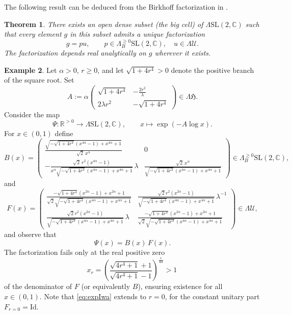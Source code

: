 \documentclass[12pt,a4paper]{amsart}
\newtheorem{theorem}{Theorem}[section]
\theoremstyle{definition}
\newtheorem{example}[theorem]{Example}
\theoremstyle{remark}
\newcommand{\R}{\mathbb R}
\newcommand{\C}{\mathbb C}
\begin{document}
The following  result can be deduced from the Birkhoff factorization in \cite{PressleySegal}. 
\begin{theorem}
There exists
an open dense subset (the \emph{big cell}) of $\Lambda\mathrm{SL}(2,\C)$ such that every
element $g$ in this subset admits a unique factorization
\[
g
=
pu,
\qquad
p\in \Lambda^{\geq0}_{B}\mathrm{SL}(2,\C),
\quad
u\in \Lambda\mathcal U.
\]
The factorization depends real analytically on $g$ wherever it exists.
\end{theorem}


\begin{example}\label{example:factor}\cite{Heller2025}
Let $\alpha>0$, $r\geq0$, and let $\sqrt{1+4r^4}>0$ denote the positive branch of the square root.
Set
\[
A
:=
\alpha
\begin{pmatrix}
 \sqrt{1+4 r^4}  & -\frac{2 r^2}{\lambda } \\
 2 \lambda r^2 & -\sqrt{1+4 r^4}
\end{pmatrix}
\in \Lambda\mathfrak H .
\]
Consider the map
\[
\Psi\colon \R^{>0}\to \Lambda\mathrm{SL}(2,\C),
\qquad
x\longmapsto \exp(-A\log x).
\]
For $x\in(0,1)$ define
\[
B(x)
=
\begin{pmatrix}
 \frac{\sqrt{-\sqrt{1+4 r^4}(x^{4\alpha}-1)+x^{4\alpha}+1}}{\sqrt{2}\,x^{\alpha}} & 0 \\[0.6em]
 -\frac{\sqrt{2}\,r^2(x^{4\alpha}-1)}{x^{\alpha}\sqrt{-\sqrt{1+4 r^4}(x^{4\alpha}-1)+x^{4\alpha}+1}}\,\lambda
 &
 \frac{\sqrt{2}\,x^{\alpha}}{\sqrt{-\sqrt{1+4 r^4}(x^{4\alpha}-1)+x^{4\alpha}+1}}
\end{pmatrix}
\in \Lambda^{\geq0}_{B}\mathrm{SL}(2,\C),
\]
and
\[
F(x)
=
\begin{pmatrix}
 \frac{-\sqrt{1+4 r^4}(x^{2\alpha}-1)+x^{2\alpha}+1}
 {\sqrt{2}\sqrt{-\sqrt{1+4 r^4}(x^{4\alpha}-1)+x^{4\alpha}+1}}
 &
 \frac{\sqrt{2}r^2(x^{2\alpha}-1)}
 {\sqrt{-\sqrt{1+4 r^4}(x^{4\alpha}-1)+x^{4\alpha}+1}}\,\lambda^{-1}
 \\[0.6em]
 \frac{\sqrt{2}r^2(x^{2\alpha}-1)}
 {\sqrt{-\sqrt{1+4 r^4}(x^{4\alpha}-1)+x^{4\alpha}+1}}\,\lambda
 &
 \frac{-\sqrt{1+4 r^4}(x^{2\alpha}-1)+x^{2\alpha}+1}
 {\sqrt{2}\sqrt{-\sqrt{1+4 r^4}(x^{4\alpha}-1)+x^{4\alpha}+1}}
\end{pmatrix}
\in \Lambda\mathcal U,
\]
and observe that
\begin{equation}\label{eq:expIwa}
\Psi(x)=B(x)\,F(x).
\end{equation}
The factorization fails only at the real positive zero 
\[
x_r
=
\left(\frac{\sqrt{4r^4+1}+1}{\sqrt{4r^4+1}-1}\right)^{\tfrac{1}{4\alpha}}
>
1\,
\]
of the denominator of $F$ (or equivalently $B$), ensuring existence for all $x\in(0,1).$
Note that \eqref{eq:expIwa} extends  to $r=0$, for the constant unitary part $F_{r=0}=\mathrm{Id}.$


\end{example}
\end{document}
